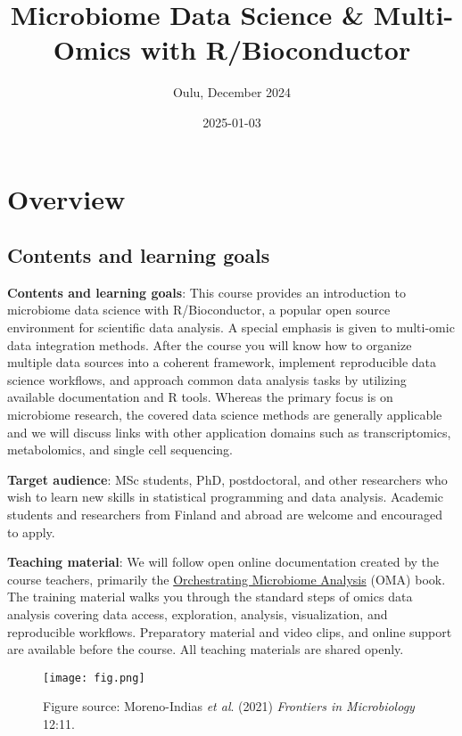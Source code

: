 \documentclass[
  oneside]{book}
\title{Microbiome Data Science \& Multi-Omics with R/Bioconductor}
\subtitle{Oulu, December 2024}
\author{}
\date{\vspace{-2.5em}2025-01-03}
\begin{document}
\maketitle

{
\setcounter{tocdepth}{1}
\tableofcontents
}
\hypertarget{overview}{%
\chapter{Overview}\label{overview}}

\hypertarget{contents-and-learning-goals}{%
\section{Contents and learning goals}\label{contents-and-learning-goals}}

\textbf{Contents and learning goals}: This course provides an introduction to microbiome data science with R/Bioconductor, a popular open source environment for scientific data analysis. A special emphasis is given to multi-omic data integration methods. After the course you will know how to organize multiple data sources into a coherent framework, implement reproducible data science workflows, and approach common data analysis tasks by utilizing available documentation and R tools. Whereas the primary focus is on microbiome research, the covered data science methods are generally applicable and we will discuss links with other application domains such as transcriptomics, metabolomics, and single cell sequencing.

\textbf{Target audience}: MSc students, PhD, postdoctoral, and other researchers who wish to learn new skills in statistical programming and data analysis. Academic students and researchers from Finland and abroad are welcome and encouraged to apply.

\textbf{Teaching material}: We will follow open online documentation created by the course teachers, primarily the \href{https://microbiome.github.io/OMA}{Orchestrating Microbiome Analysis} (OMA) book. The training material walks you through the standard steps of omics data analysis covering data access, exploration, analysis, visualization, and reproducible workflows. Preparatory material and video clips, and online support are available before the course. All teaching materials are shared openly.

\begin{figure}
\centering
\texttt{[image: fig.png]}
\caption{Figure source: Moreno-Indias \emph{et al}. (2021) \emph{Frontiers in Microbiology} 12:11.}
\end{figure}
\end{document}
